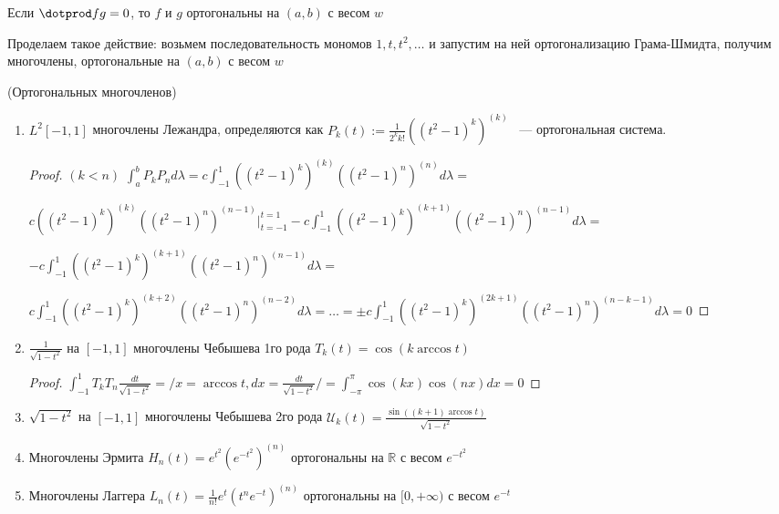  Если $\dotprod fg = 0$, то $f$ и $g$ ортогональны на $(a, b)$ с весом $w$
 
 Проделаем такое действие: возьмем последовательность мономов $1, t, t^2, \ldots$ и запустим
  на ней ортогонализацию Грама-Шмидта, получим многочлены, ортогональные на $(a, b)$ с весом $w$
  
  \begin{examples} (Ортогональных многочленов)
  	\begin{enumerate}
		\item $L^2[-1, 1]$ многочлены Лежандра, определяются как $P_k(t) := \frac{1}{2^k k!}((t^2 - 1)^k)^{(k)}$ ~--- ортогональная система.
		
		\begin{proof}
		$(k < n)$ $\int_a^b P_k P_n d\lambda = c  \int_{-1}^1 ((t^2 - 1)^k)^{(k)}((t^2 - 1)^n)^{(n)} d\lambda
		=$
		
		$  c((t^2 - 1)^k)^{(k)}((t^2 - 1)^n)^{(n - 1)} \Big|_{t = -1}^{t = 1} -
		 c \int_{-1}^1 ((t^2 - 1)^k)^{(k + 1)}((t^2 - 1)^n)^{(n - 1)} d\lambda =$
		 
		 $ -
		 c \int_{-1}^1 ((t^2 - 1)^k)^{(k + 1)}((t^2 - 1)^n)^{(n - 1)} d\lambda =$
		 
		 $c \int_{-1}^1 ((t^2 - 1)^k)^{(k + 2)}((t^2 - 1)^n)^{(n - 2)} d\lambda = \ldots =
		 \pm c \int_{-1}^1 ((t^2 - 1)^k)^{(2k + 1)}((t^2 - 1)^n)^{(n - k - 1)} d\lambda= 0$
		 \end{proof}
		 
		 \item $\frac{1}{\sqrt{1 - t^2}}$ на $[-1, 1]$ многочлены Чебышева 1го рода 
		 $T_k(t) = \cos(k\arccos t)$
		 
		 \begin{proof}
		$\int_{-1}^1 T_k T_n \frac{dt}{\sqrt{1 - t^2}} =  / x = \arccos t, dx = \frac{dt}{\sqrt{1 - t^2}}/ =
		\int_{-\pi}^\pi \cos(kx)\cos(nx)dx = 0$
		
		 \end{proof}
		 
		  \item $\sqrt{1 - t^2}$ на $[-1, 1]$ многочлены Чебышева 2го рода 
		 $\mathcal{U}_k(t) = \frac{\sin((k+1)\arccos t)}{\sqrt{1-t^2}}$
		 
		 \item Многочлены Эрмита 
		 $H_n(t) = e^{t^2}(e^{-t^2})^{(n)}$ ортогональны на $\mathbb{R}$ с весом $e^{-t^2}$
		 
		 \item Многочлены Лаггера $L_n(t) = \frac{1}{n!}e^t(t^n e^{-t})^{(n)}$ ортогональны на
		 $[0, +\infty)$ с весом $e^{-t}$
	\end{enumerate}
  \end{examples}
  
